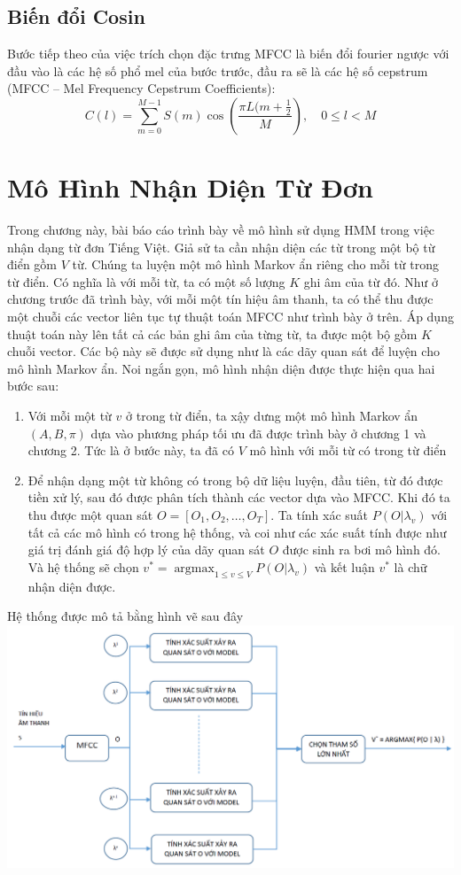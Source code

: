\documentclass[13pt]{extreport}
\DeclareMathOperator*{\argmax}{argmax} %
\begin{document}
\section{Biến đổi Cosin}
Bước tiếp theo của việc trích chọn đặc trưng MFCC là biến đổi fourier ngược với đầu vào là các hệ số phổ mel của bước trước, đầu ra sẽ là các hệ số cepstrum (MFCC – Mel Frequency Cepstrum Coefficients):
$$C(l)=\sum_{m=0}^{M-1} S(m)\cos\left(\frac{\pi L(m+\frac{1}{2}}{M}\right), \quad 0\le l<M$$

\chapter{Mô Hình Nhận Diện Từ Đơn}
Trong chương này, bài báo cáo trình bày về mô hình sử dụng HMM trong việc nhận dạng từ đơn Tiếng Việt. Giả sử ta cần nhận diện các từ trong một bộ từ điển gồm $V$ từ. Chúng ta luyện một mô hình Markov ẩn riêng cho mỗi từ trong từ điển. Có nghĩa là với mỗi từ, ta có một số lượng $K$ ghi âm của từ đó. Như ở chương trước đã trình bày, với mỗi một tín hiệu âm thanh, ta có thể thu được một chuỗi các vector liên tục tự thuật toán MFCC như trình bày ở trên. Áp dụng thuật toán này lên tất cả các bản ghi âm của từng từ, ta được một bộ gồm $K$ chuỗi vector. Các bộ này sẽ được sử dụng như là các dãy quan sát để luyện cho mô hình Markov ẩn. Noi ngắn gọn, mô hình nhận diện được thực hiện qua hai bước sau:
\begin{enumerate}
\item Với mỗi một từ $v$ ở trong từ điển, ta xậy dưng một mô hình Markov ẩn $(A, B, \pi)$ dựa vào phương pháp tối ưu đã được trình bày ở chương 1 và chương 2. Tức là ở bước này, ta đã có $V$ mô hình với mỗi từ có trong từ điển 
\item Để nhận dạng một từ không có trong bộ dữ liệu luyện, đầu tiên, từ đó được tiền xử lý, sau đó được phân tích thành các vector dựa vào MFCC. Khi đó ta thu được một quan sát $O = [O_1, O_2, \dots, O_T]$. Ta tính xác suất $P(O | \lambda_v)$ với tất cả các mô hình có trong hệ thống, và coi như các xác suất tính được như giá trị đánh giá độ hợp lý của dãy quan sát $O$ được sinh ra bơi mô hình đó. Và hệ thống sẽ chọn $v^* = \argmax_{1 \leq v \leq V} P(O | \lambda_v)$ và kết luận $v^*$ là chữ nhận diện được. \\
\end{enumerate}
Hệ thống được mô tả bằng hình vẽ sau đây \\
\includegraphics[scale=0.55]{./model.PNG} \\
\end{document}
